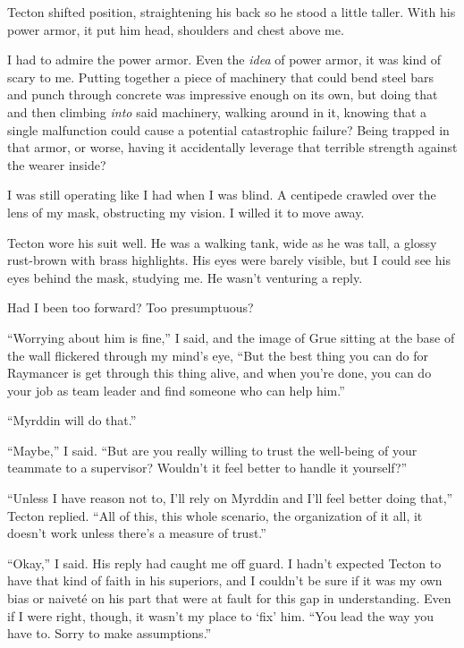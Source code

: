 Tecton shifted position, straightening his back so he stood a little taller.  With his power armor, it put him head, shoulders and chest above me.



I had to admire the power armor.  Even the \emph{idea} of power armor, it was kind of scary to me.  Putting together a piece of machinery that could bend steel bars and punch through concrete was impressive enough on its own, but doing that and then climbing \emph{into }said machinery, walking around in it, knowing that a single malfunction could cause a potential catastrophic failure?  Being trapped in that armor, or worse, having it accidentally leverage that terrible strength against the wearer inside?



I was still operating like I had when I was blind.  A centipede crawled over the lens of my mask, obstructing my vision.  I willed it to move away.



Tecton wore his suit well.  He was a walking tank, wide as he was tall, a glossy rust-brown with brass highlights.  His eyes were barely visible, but I could see his eyes behind the mask, studying me.  He wasn't venturing a reply.



Had I been too forward?  Too presumptuous?



``Worrying about him is fine,'' I said, and the image of Grue sitting at the base of the wall flickered through my mind's eye, ``But the best thing you can do for Raymancer is get through this thing alive, and when you're done, you can do your job as team leader and find someone who can help him.''



``Myrddin will do that.''



``Maybe,'' I said.  ``But are you really willing to trust the well-being of your teammate to a supervisor?  Wouldn't it feel better to handle it yourself?''



``Unless I have reason not to, I'll rely on Myrddin and I'll feel better doing that,'' Tecton replied.  ``All of this, this whole scenario, the organization of it all, it doesn't work unless there's a measure of trust.''



``Okay,'' I said.  His reply had caught me off guard.  I hadn't expected Tecton to have that kind of faith in his superiors, and I couldn't be sure if it was my own bias or naivet\'{e} on his part that were at fault for this gap in understanding.  Even if I were right, though, it wasn't my place to `fix' him.  ``You lead the way you have to.  Sorry to make assumptions.''



